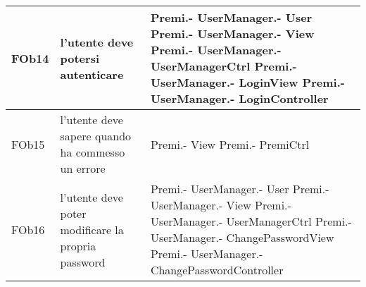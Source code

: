 \begin{longtable}{|l|p{5cm}|p{4cm}|}
FOb14 & l'utente deve potersi autenticare & Premi.- \linebreak UserManager.- \linebreak User \linebreak Premi.- \linebreak UserManager.- \linebreak View \linebreak Premi.- \linebreak UserManager.- \linebreak UserManagerCtrl \linebreak Premi.- \linebreak UserManager.- \linebreak LoginView \linebreak Premi.- \linebreak UserManager.- \linebreak LoginController \linebreak \\
\hline
FOb15 & l'utente deve sapere quando ha commesso un errore & Premi.- \linebreak View \linebreak Premi.- \linebreak PremiCtrl \linebreak \\
\hline
FOb16 & l'utente deve poter modificare la propria password & Premi.- \linebreak UserManager.- \linebreak User \linebreak Premi.- \linebreak UserManager.- \linebreak View \linebreak Premi.- \linebreak UserManager.- \linebreak UserManagerCtrl \linebreak Premi.- \linebreak UserManager.- \linebreak ChangePasswordView \linebreak Premi.- \linebreak UserManager.- \linebreak ChangePasswordController \linebreak \\
\hline

\end{longtable}
